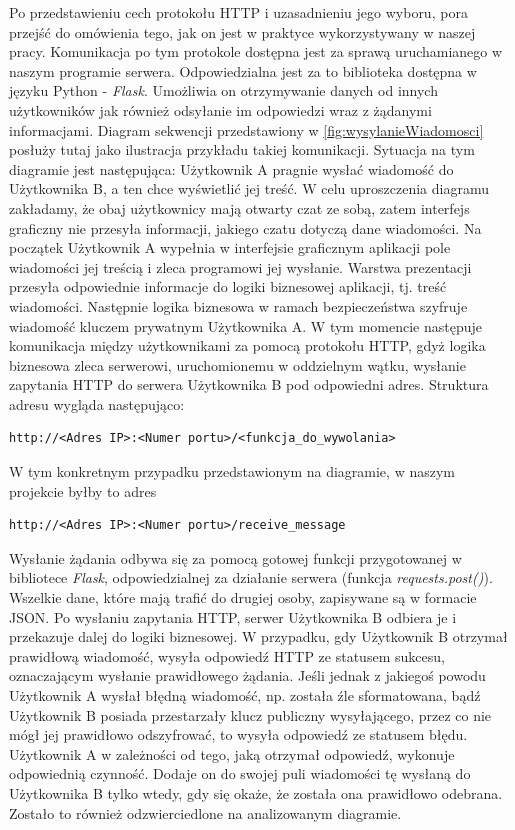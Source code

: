 \par Po przedstawieniu cech protokołu HTTP i uzasadnieniu jego wyboru, pora przejść do omówienia tego, jak on jest w praktyce wykorzystywany w naszej pracy. Komunikacja po tym protokole dostępna jest za sprawą uruchamianego w naszym programie serwera. Odpowiedzialna jest za to biblioteka dostępna w języku Python - \textit{Flask}. Umożliwia on otrzymywanie danych od innych użytkowników jak również odsyłanie im odpowiedzi wraz z żądanymi informacjami. Diagram sekwencji przedstawiony w \figurename{ \ref{fig:wysylanieWiadomosci}} posłuży tutaj jako ilustracja przykładu takiej komunikacji. Sytuacja na tym diagramie jest następująca: Użytkownik A pragnie wysłać wiadomość do Użytkownika B, a ten chce wyświetlić jej treść. W celu uproszczenia diagramu zakładamy, że obaj użytkownicy mają otwarty czat ze sobą, zatem interfejs graficzny nie przesyła informacji, jakiego czatu dotyczą dane wiadomości. Na początek Użytkownik A wypełnia w interfejsie graficznym aplikacji pole wiadomości jej treścią i zleca programowi jej wysłanie. Warstwa prezentacji przesyła odpowiednie informacje do logiki biznesowej aplikacji, tj. treść wiadomości. Następnie logika biznesowa w ramach bezpieczeństwa szyfruje wiadomość kluczem prywatnym Użytkownika A. W tym momencie następuje komunikacja między użytkownikami za pomocą protokołu HTTP, gdyż logika biznesowa zleca serwerowi, uruchomionemu w oddzielnym wątku, wysłanie zapytania HTTP do serwera Użytkownika B pod odpowiedni adres. Struktura adresu wygląda następująco:
\begin{lstlisting}[caption={Struktura adresu docelowego}]
http://<Adres IP>:<Numer portu>/<funkcja_do_wywolania>
\end{lstlisting}
W tym konkretnym przypadku przedstawionym na diagramie, w naszym projekcie byłby to adres
\begin{lstlisting}[caption={Adres docelowy wywołania funkcji odbierania wiadomości}]
http://<Adres IP>:<Numer portu>/receive_message
\end{lstlisting}
Wysłanie żądania odbywa się za pomocą gotowej funkcji przygotowanej w bibliotece \textit{Flask}, odpowiedzialnej za działanie serwera (funkcja \textit{requests.post()}). Wszelkie dane, które mają trafić do drugiej osoby, zapisywane są w formacie JSON. Po wysłaniu zapytania HTTP, serwer Użytkownika B odbiera je i przekazuje dalej do logiki biznesowej. W przypadku, gdy Użytkownik B otrzymał prawidłową wiadomość, wysyła odpowiedź HTTP ze statusem sukcesu, oznaczającym wysłanie prawidłowego żądania. Jeśli jednak z jakiegoś powodu Użytkownik A wysłał błędną wiadomość, np. została źle sformatowana, bądź Użytkownik B posiada przestarzały klucz publiczny wysyłającego, przez co nie mógł jej prawidłowo odszyfrować, to wysyła odpowiedź ze statusem błędu. Użytkownik A w zależności od tego, jaką otrzymał odpowiedź, wykonuje odpowiednią czynność. Dodaje on do swojej puli wiadomości tę wysłaną do Użytkownika B tylko wtedy, gdy się okaże, że została ona prawidłowo odebrana. Zostało to również odzwierciedlone na analizowanym diagramie.

